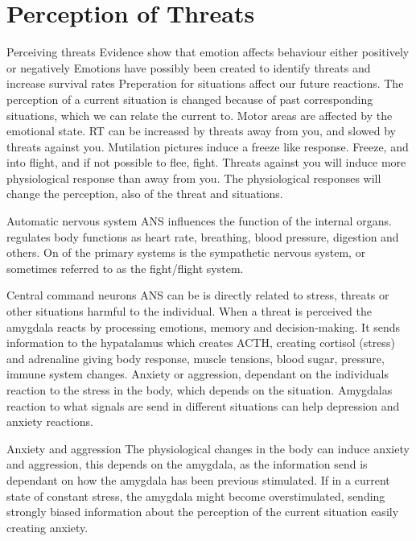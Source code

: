 \section{Perception of Threats} \label{perception}

Perceiving threats
	Evidence show that emotion affects behaviour either positively or negatively
	Emotions have possibly been created to identify threats and increase survival rates
	Preperation for situations affect our future reactions. The perception of a current situation is changed because of past corresponding situations, which we can relate the current to.
	Motor areas are affected by the emotional state.
	RT can be increased by threats away from you, and slowed by threats against you. Mutilation pictures induce a freeze like response. Freeze, and into flight, and if not possible to flee, fight.
	Threats against you will induce more physiological response than away from you.
	The physiological responses will change the perception, also of the threat and situations.

Automatic nervous system
	ANS influences the function of the internal organs. regulates body functions as heart rate, breathing, blood pressure, digestion and others. On of the primary systems is the sympathetic nervous system, or sometimes referred to as the fight/flight system. 	%

Central command neurons
	ANS can be is directly related to stress, threats or other situations harmful to the individual.
	When a threat is perceived the amygdala reacts by processing emotions, memory and decision-making. It sends information to the hypatalamus which creates ACTH, creating cortisol (stress) and adrenaline giving body response, muscle tensions, blood sugar, pressure, immune system changes. Anxiety or aggression, dependant on the individuals reaction to the stress in the body, which depends on the situation. Amygdalas reaction to what signals are send in different situations can help depression and anxiety reactions.
	
Anxiety and aggression
	The physiological changes in the body can induce anxiety and aggression, this depends on the amygdala, as the information send is dependant on how the amygdala has been previous stimulated. If in a current state of constant stress, the amygdala might become overstimulated, sending strongly biased information about the perception of the current situation easily creating anxiety. %